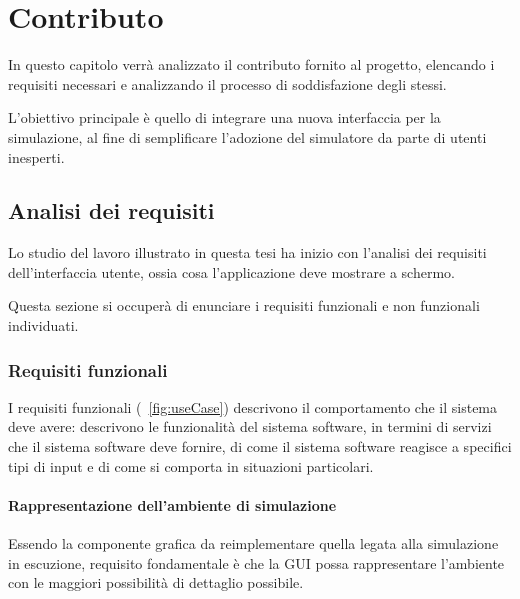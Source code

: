 

\chapter{Contributo}\label{ch:contributo}
    In questo capitolo verrà analizzato il contributo fornito al progetto, elencando i requisiti necessari e analizzando il processo di soddisfazione degli stessi.

    L'obiettivo principale è quello di integrare una nuova interfaccia per la simulazione, al fine di semplificare l’adozione del simulatore da parte di utenti inesperti.

    \section{Analisi dei requisiti}\label{sec:analisi}
        Lo studio del lavoro illustrato in questa tesi ha inizio con l'analisi dei requisiti dell’interfaccia utente, ossia cosa l'applicazione deve mostrare a schermo.

        Questa sezione si occuperà di enunciare i requisiti funzionali e non funzionali individuati.

        \subsection{Requisiti funzionali}\label{sub:funzionali}
            I requisiti funzionali (\figurename~\ref{fig:useCase}) descrivono il comportamento che il sistema deve avere:
            descrivono le funzionalità del sistema software, in termini di servizi che il sistema software deve fornire, di come il sistema software reagisce a specifici tipi di input e di come si comporta in situazioni particolari.

            \subsubsection{Rappresentazione dell'ambiente di simulazione}\label{subsub:seeEnv}
                Essendo la componente grafica da reimplementare quella legata alla simulazione in escuzione, requisito fondamentale è che la GUI possa rappresentare l'ambiente con le maggiori possibilità di dettaglio possibile.

